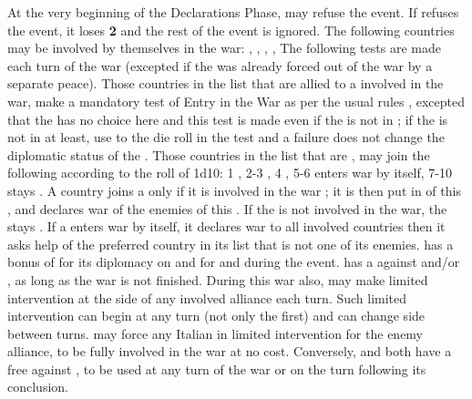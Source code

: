 \phdipl
{}
\bparag At the very beginning of the Declarations Phase, \FRA may refuse the
event.
\bparag If \FRA refuses the event, it loses {\bf 2} \STAB and the rest of the
event is ignored.
\bparag The following countries may be involved by themselves in the war:
\paysGenes, \paysMilan, \payspapaute, \paysSavoie, The following tests are
made each turn of the war (excepted if the \MIN was already forced out of the
war by a separate peace).
\bparag Those countries in the list that are allied to a \MAJ involved in the
war, make a mandatory test of Entry in the War as per the usual rules
, excepted that the \MAJ has no choice here
and this test is made even if the \MIN is not in \EG; if the \MIN is not in
\EG at least, use  to the die roll in the test and a failure does
not change the diplomatic status of the \MIN.
\bparag Those countries in the list that are \Neutral, may join the following
\MAJ according to the roll of 1d10: 1 \FRA, 2-3 \HAB, 4 \VEN, 5-6 enters war
by itself, 7-10 stays \Neutral. A country joins a \MAJ only if it is involved
in the war ; it is then put in \EG of this \MAJ, and declares war of the
enemies of this \MAJ. If the \MAJ is not involved in the war, the \MIN stays
\Neutral.
\bparag If a \MIN enters war by itself, it declares war to all involved
countries then it asks help of the preferred country in its list that is not
one of its enemies.
 \FRA has a bonus of  for its
diplomacy on \paysToscane and  for \payspapaute and \paysParme
during the event.
\bparag \VEN has a \CB against \FRA and/or \paysNaples, as long as the war is
not finished.
\bparag During this war also, \VEN may make limited intervention at the side
of any involved alliance each turn. Such limited intervention can begin at any
turn (not only the first) and \VEN can change side between turns. \VEN may
force any Italian \MIN in limited intervention for the enemy alliance, to be
fully involved in the war at no cost.
\bparag Conversely, \FRA and \HAB both have a free \CB against \VEN, to be
used at any turn of the war or on the turn following its conclusion.

